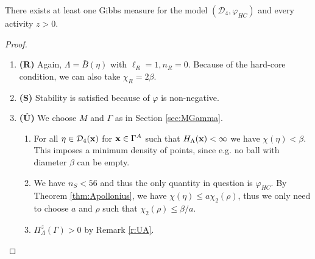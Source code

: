 


\begin{theorem}\label{thm:E2}
	There exists at least one Gibbs measure for the model $(\mathcal D_4,\varphi_{HC})$ and every activity $z>0.$
\end{theorem}
\begin{proof}
\begin{enumerate}[]
	\item \textbf{(R)} Again, $\Lambda = \bar B(\eta)$ with $\ell_R = 1, n_R = 0$. Because of the hard-core condition, we can also take $\chi_R = 2\beta$.
	\item \textbf{(S)} Stability is satisfied because of $\varphi$ is non-negative.
	\item \textbf{(\^U)} We choose $M$ and $\Gamma$ as in Section \ref{sec:MGamma}.
		\begin{enumerate}[(\^U1)]
			\item For all $\eta \in \mathcal D_4({\mathbf{x}})$ for ${\mathbf{x}}\in\Gamma^A$ such that $H_\Lambda({\mathbf{x}})<\infty$ we have $\chi(\eta) < \beta$. This imposes a minimum density of points, since e.g. no ball with diameter $\beta$ can be empty. 
			\item We have $n_S<56$ and thus the only quantity in question is $\varphi_{HC}$. By Theorem \ref{thm:Apollonius}, we have $\chi(\eta)\leq a\chi_2(\rho)$, thus we only need to choose $a$ and $\rho$ such that $\chi_2(\rho) \leq \beta / a$.
			\item $\Pi^z_\Lambda(\Gamma)>0$ by Remark \ref{r:UA}.
		\end{enumerate}
\end{enumerate}
\end{proof}



